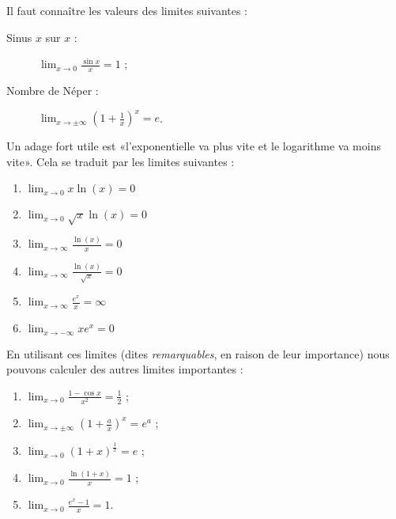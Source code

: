 
\begin{exercice}[\minsyndical]\label{exoTD2A-2}
Il faut conna\^{i}tre les valeurs des limites suivantes :
\begin{description}
\item[Sinus $x$ sur $x$ :] 
  $\displaystyle \lim_{x\to 0}\frac{\sin x}{x}=1$ ;
\item[Nombre de Néper :] 
  $\displaystyle \lim_{x\to \pm\infty}\left(1+\frac{1}{x}\right)^x=e$.
\end{description}

Un adage fort utile est «l'exponentielle va plus vite et le logarithme va moins vite». Cela se traduit par les limites suivantes :
\begin{multicols}{2}
	\begin{enumerate}
	\item
		$\lim_{x\to 0} x\ln(x)=0$
	\item
		$\lim_{x\to 0} \sqrt{x}\ln(x)=0$
	\item
		$\lim_{x\to \infty} \displaystyle\frac{ \ln(x) }{ x }=0$
	\item
		$\lim_{x\to \infty} \displaystyle\frac{ \ln(x) }{ \sqrt{x} }=0$
	\item
		$\lim_{x\to \infty} \displaystyle\frac{  e^{x} }{ x }=\infty$
	\item
		$\lim_{x\to -\infty} xe^x=0$
	\end{enumerate}
\end{multicols}

En utilisant ces limites (dites \emph{remarquables}, en raison de leur importance) nous pouvons calculer des autres limites importantes :
\begin{enumerate}
\item 
  $\displaystyle \lim_{x\to 0}\frac{1-\cos x}{x^2}=\frac{1}{2}$ ;
\item
  $\displaystyle \lim_{x\to \pm\infty}\left(1+\frac{a}{x}\right)^x=e^a$ ;
\item 
  $\displaystyle \lim_{x\to 0}(1+x)^{\frac{1}{x}}=e$ ;
\item 
  $\displaystyle \lim_{x\to 0}\frac{\ln(1+x)}{x}=1$ ;
\item 
  $\displaystyle \lim_{x\to 0}\frac{e^x-1}{x}=1$.
\end{enumerate}
  
\end{exercice}
